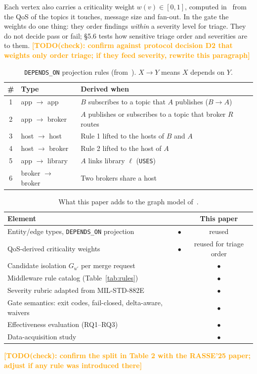 \documentclass[sigconf,screen]{acmart}
\newcommand{\TODOcheck}[1]{\textcolor{orange}{\textbf{[TODO(check): #1]}}}
\begin{document}
Each vertex also carries a criticality weight $w(v)\in[0,1]$, computed in~\cite{yigit2025graph} from the QoS of the topics it touches, message size and fan-out. In the gate the weights do one thing: they order findings \emph{within} a severity level for triage. They do not decide pass or fail; \S5.6 tests how sensitive triage order and severities are to them. \TODOcheck{confirm against protocol decision D2 that weights only order triage; if they feed severity, rewrite this paragraph}

\begin{table}[t]
\centering
\caption{\texttt{DEPENDS\_ON} projection rules (from~\cite{yigit2025graph}). $X \to Y$ means $X$ depends on $Y$.}
\label{tab:dep_rules}
\small
\begin{tabularx}{\columnwidth}{c l Y}
\toprule
\# & Type & Derived when \\
 & app $\to$ app & $B$ subscribes to a topic that $A$ publishes ($B \to A$) \\
2 & app $\to$ broker & $A$ publishes or subscribes to a topic that broker $R$ routes \\
3 & host $\to$ host & Rule 1 lifted to the hosts of $B$ and $A$ \\
4 & host $\to$ broker & Rule 2 lifted to the host of $A$ \\
5 & app $\to$ library & $A$ links library $\ell$ (\texttt{USES}) \\
6 & broker $\to$ broker & Two brokers share a host \\
\bottomrule
\end{tabularx}
\end{table}

\begin{table}[t]
\centering
\caption{What this paper adds to the graph model of~\cite{yigit2025graph}.}
\label{tab:delta}
\small
\begin{tabularx}{\columnwidth}{Y c c}
\toprule
Element & \cite{yigit2025graph} & This paper \\
\midrule
Entity/edge types, \texttt{DEPENDS\_ON} projection & $\bullet$ & reused \\
QoS-derived criticality weights & $\bullet$ & reused for triage order \\
Candidate isolation $G_{u'}$ per merge request & & $\bullet$ \\
Middleware rule catalog (Table~\ref{tab:rules}) & & $\bullet$ \\
Severity rubric adapted from MIL-STD-882E & & $\bullet$ \\
Gate semantics: exit codes, fail-closed, delta-aware, waivers & & $\bullet$ \\
Effectiveness evaluation (RQ1--RQ3) & & $\bullet$ \\
Data-acquisition study & & $\bullet$ \\
\bottomrule
\end{tabularx}
\end{table}
\TODOcheck{confirm the split in Table 2 with the RASSE'25 paper; adjust if any rule was introduced there}
\end{document}
